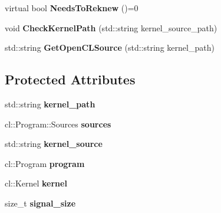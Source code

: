 \begin{DoxyCompactItemize}
\item 
virtual bool {\bfseries Needs\+To\+Reknew} ()=0\hypertarget{classjaspl_1_1ocl_1_1_task_item_a25b4d12cca2fcab5c2d231e1133ce048}{}\label{classjaspl_1_1ocl_1_1_task_item_a25b4d12cca2fcab5c2d231e1133ce048}

\item 
void {\bfseries Check\+Kernel\+Path} (std\+::string kernel\+\_\+source\+\_\+path)\hypertarget{classjaspl_1_1ocl_1_1_task_item_af048f07b953902e9ac048fb32dc86535}{}\label{classjaspl_1_1ocl_1_1_task_item_af048f07b953902e9ac048fb32dc86535}

\item 
std\+::string {\bfseries Get\+Open\+C\+L\+Source} (std\+::string kernel\+\_\+path)\hypertarget{classjaspl_1_1ocl_1_1_task_item_a015a0fc3c5fe671b6f9d529a77cb4132}{}\label{classjaspl_1_1ocl_1_1_task_item_a015a0fc3c5fe671b6f9d529a77cb4132}

\end{DoxyCompactItemize}
\subsection*{Protected Attributes}
\begin{DoxyCompactItemize}
\item 
std\+::string {\bfseries kernel\+\_\+path}\hypertarget{classjaspl_1_1ocl_1_1_task_item_aa08a1b3eaff97acd4083d81de0d78de9}{}\label{classjaspl_1_1ocl_1_1_task_item_aa08a1b3eaff97acd4083d81de0d78de9}

\item 
cl\+::\+Program\+::\+Sources {\bfseries sources}\hypertarget{classjaspl_1_1ocl_1_1_task_item_acf5a7b33791d535255f524dd7bdafa2d}{}\label{classjaspl_1_1ocl_1_1_task_item_acf5a7b33791d535255f524dd7bdafa2d}

\item 
std\+::string {\bfseries kernel\+\_\+source}\hypertarget{classjaspl_1_1ocl_1_1_task_item_a90439204dd331c6a4f488e3c6016ddfa}{}\label{classjaspl_1_1ocl_1_1_task_item_a90439204dd331c6a4f488e3c6016ddfa}

\item 
cl\+::\+Program {\bfseries program}\hypertarget{classjaspl_1_1ocl_1_1_task_item_afd9f6878a4a075d6fbc9cb2a74f3ac2e}{}\label{classjaspl_1_1ocl_1_1_task_item_afd9f6878a4a075d6fbc9cb2a74f3ac2e}

\item 
cl\+::\+Kernel {\bfseries kernel}\hypertarget{classjaspl_1_1ocl_1_1_task_item_ab628ae818420624811dee92ce68615fd}{}\label{classjaspl_1_1ocl_1_1_task_item_ab628ae818420624811dee92ce68615fd}

\item 
size\+\_\+t {\bfseries signal\+\_\+size}\hypertarget{classjaspl_1_1ocl_1_1_task_item_a8a21af3a15a0010ae139cc6b0555c380}{}\label{classjaspl_1_1ocl_1_1_task_item_a8a21af3a15a0010ae139cc6b0555c380}

\end{DoxyCompactItemize}

